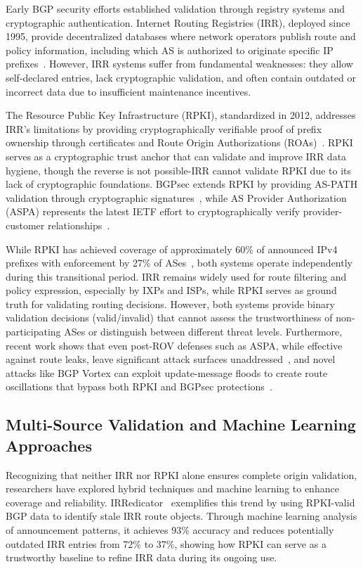 \documentclass[conference]{IEEEtran}
\begin{document}
Early BGP security efforts established validation through registry systems and cryptographic authentication. Internet Routing Registries (IRR), deployed since 1995, provide decentralized databases where network operators publish route and policy information, including which AS is authorized to originate specific IP prefixes~\cite{DuIRATSc23}. However, IRR systems suffer from fundamental weaknesses: they allow self-declared entries, lack cryptographic validation, and often contain outdated or incorrect data due to insufficient maintenance incentives.

The Resource Public Key Infrastructure (RPKI), standardized in 2012, addresses IRR's limitations by providing cryptographically verifiable proof of prefix ownership through certificates and Route Origin Authorizations (ROAs)~\cite{RPKI}. RPKI serves as a cryptographic trust anchor that can validate and improve IRR data hygiene, though the reverse is not possible-IRR cannot validate RPKI due to its lack of cryptographic foundations. BGPsec extends RPKI by providing AS-PATH validation through cryptographic signatures~\cite{bgpsec}, while AS Provider Authorization (ASPA) represents the latest IETF effort to cryptographically verify provider-customer relationships~\cite{furuness2025aspa}.

While RPKI has achieved coverage of approximately 60\% of announced IPv4 prefixes with enforcement by 27\% of ASes~\cite{KangLRKC24IRRedicator}, both systems operate independently during this transitional period. IRR remains widely used for route filtering and policy expression, especially by IXPs and ISPs, while RPKI serves as ground truth for validating routing decisions. However, both systems provide binary validation decisions (valid/invalid) that cannot assess the trustworthiness of non-participating ASes or distinguish between different threat levels. Furthermore, recent work shows that even post-ROV defenses such as ASPA, while effective against route leaks, leave significant attack surfaces unaddressed~\cite{furuness2025aspa}, and novel attacks like BGP Vortex can exploit update-message floods to create route oscillations that bypass both RPKI and BGPsec protections~\cite{stoger2025vortex}.

\subsection{Multi-Source Validation and Machine Learning Approaches}

Recognizing that neither IRR nor RPKI alone ensures complete origin validation, researchers have explored hybrid techniques and machine learning to enhance coverage and reliability. IRRedicator~\cite{KangLRKC24IRRedicator} exemplifies this trend by using RPKI-valid BGP data to identify stale IRR route objects. Through machine learning analysis of announcement patterns, it achieves 93\% accuracy and reduces potentially outdated IRR entries from 72\% to 37\%, showing how RPKI can serve as a trustworthy baseline to refine IRR data during its ongoing use.
\end{document}
